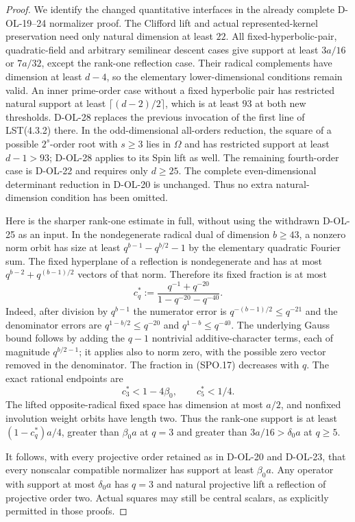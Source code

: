 \begin{proof}
We identify the changed quantitative interfaces in the
already complete D-OL-19--24 normalizer proof.
The Clifford lift and actual represented-kernel preservation
need only natural dimension at least $22$.
All fixed-hyperbolic-pair, quadratic-field and arbitrary
semilinear descent cases give support at least $3a/16$ or
$7a/32$, except the rank-one reflection case.
Their radical complements have dimension at least $d-4$,
so the elementary lower-dimensional conditions remain valid.
An inner prime-order case without a fixed hyperbolic pair
has restricted natural support at least
$\lceil(d-2)/2\rceil$, which is at least $93$ at both
new thresholds.  D-OL-28 replaces the previous invocation
of the first line of LST(4.3.2) there.
In the odd-dimensional all-orders reduction, the square of
a possible $2^s$-order root with $s\ge3$ lies in $\Omega$
and has restricted support at least $d-1>93$;
D-OL-28 applies to its Spin lift as well.
The remaining fourth-order case is D-OL-22 and requires
only $d\ge25$.
The complete even-dimensional determinant reduction in
D-OL-20 is unchanged.  Thus no extra natural-dimension
condition has been omitted.

Here is the sharper rank-one estimate in full, without
using the withdrawn D-OL-25 as an input.
In the nondegenerate radical dual of dimension $b\ge43$,
a nonzero norm orbit has size at least
$q^{b-1}-q^{b/2}-1$ by the elementary quadratic Fourier
sum.  The fixed hyperplane of a reflection is nondegenerate
and has at most $q^{b-2}+q^{(b-1)/2}$ vectors of that norm.
Therefore its fixed fraction is at most
\[
 c_q^*:=\frac{q^{-1}+q^{-20}}{1-q^{-20}-q^{-40}}.
 \tag{SPO.17}
\]
Indeed, after division by $q^{b-1}$ the numerator error
is $q^{-(b-1)/2}\le q^{-21}$ and the denominator errors
are $q^{1-b/2}\le q^{-20}$ and $q^{1-b}\le q^{-40}$.
The underlying Gauss bound follows by adding the $q-1$
nontrivial additive-character terms, each of magnitude
$q^{b/2-1}$; it applies also to norm zero, with the
possible zero vector removed in the denominator.
The fraction in (SPO.17) decreases with $q$.
The exact rational endpoints are
\[
           c_3^*<1-4\beta_0,\qquad c_5^*<1/4.
 \tag{SPO.18}
\]
The lifted opposite-radical fixed space has dimension
at most $a/2$, and nonfixed involution weight orbits
have length two.  Thus the rank-one support is at least
$(1-c_q^*)a/4$, greater than $\beta_0a$ at $q=3$ and
greater than $3a/16>\delta_0a$ at $q\ge5$.

It follows, with every projective order retained as in
D-OL-20 and D-OL-23, that every nonscalar compatible
normalizer has support at least $\beta_0a$.
Any operator with support at most $\delta_0a$ has
$q=3$ and natural projective lift a reflection of
projective order two.  Actual squares may still be
central scalars, as explicitly permitted in those proofs.


\end{proof}
